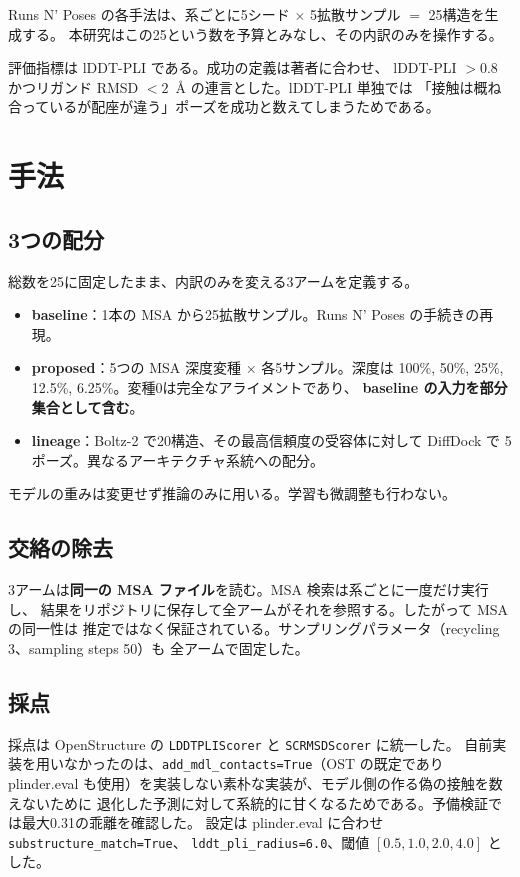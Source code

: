 \documentclass[11pt]{article}
\begin{document}
Runs N' Poses の各手法は、系ごとに5シード $\times$ 5拡散サンプル $=$ 25構造を生成する。
本研究はこの25という数を予算とみなし、その内訳のみを操作する。

評価指標は lDDT-PLI である。成功の定義は著者に合わせ、
lDDT-PLI $> 0.8$ かつリガンド RMSD $< 2$~\AA{} の連言とした。lDDT-PLI 単独では
「接触は概ね合っているが配座が違う」ポーズを成功と数えてしまうためである。

\section{手法}

\subsection{3つの配分}

総数を25に固定したまま、内訳のみを変える3アームを定義する。

\begin{itemize}
\item \textbf{baseline}：1本の MSA から25拡散サンプル。Runs N' Poses の手続きの再現。
\item \textbf{proposed}：5つの MSA 深度変種 $\times$ 各5サンプル。深度は
      100\%, 50\%, 25\%, 12.5\%, 6.25\%。変種0は完全なアライメントであり、
      \textbf{baseline の入力を部分集合として含む}。
\item \textbf{lineage}：Boltz-2 で20構造、その最高信頼度の受容体に対して DiffDock で
      5ポーズ。異なるアーキテクチャ系統への配分。
\end{itemize}

モデルの重みは変更せず推論のみに用いる。学習も微調整も行わない。

\subsection{交絡の除去}

3アームは\textbf{同一の MSA ファイル}を読む。MSA 検索は系ごとに一度だけ実行し、
結果をリポジトリに保存して全アームがそれを参照する。したがって MSA の同一性は
推定ではなく保証されている。サンプリングパラメータ（recycling 3、sampling steps 50）も
全アームで固定した。

\subsection{採点}

採点は OpenStructure の \texttt{LDDTPLIScorer} と \texttt{SCRMSDScorer} に統一した。
自前実装を用いなかったのは、\texttt{add\_mdl\_contacts=True}（OST の既定であり
plinder.eval も使用）を実装しない素朴な実装が、モデル側の作る偽の接触を数えないために
退化した予測に対して系統的に甘くなるためである。予備検証では最大0.31の乖離を確認した。
設定は plinder.eval に合わせ \texttt{substructure\_match=True}、
\texttt{lddt\_pli\_radius=6.0}、閾値 $[0.5, 1.0, 2.0, 4.0]$ とした。
\end{document}
